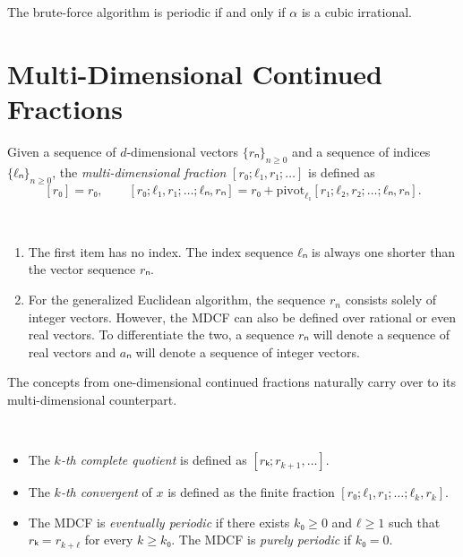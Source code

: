 \begin{conjecture}
  The brute-force algorithm is periodic if and only if $α$ is a cubic irrational.
\end{conjecture}

\section{Multi-Dimensional Continued Fractions}

\begin{definition}
  Given a sequence of $d$-dimensional vectors $\{rₙ\}_{n ≥ 0}$ and a sequence of
  indices $\{ℓₙ\}_{n ≥ 0}$, the \emph{multi-dimensional fraction} $[r₀; ℓ₁, r₁; …]$ is defined as
  \[
    [r₀] = r₀, \qquad [r₀; ℓ₁, r₁; …; ℓₙ, rₙ] = r₀ + \mathrm{pivot}_{ℓ₁}[r₁; ℓ₂, r₂; …; ℓₙ, rₙ].
  \]
\end{definition}

\begin{remark}~
  \begin{enumerate}
    \item
      The first item has no index.
      The index sequence $ℓₙ$ is always one shorter than the vector sequence $rₙ$.
    \item
      For the generalized Euclidean algorithm, the sequence $r_n$ consists solely of integer vectors.
      However, the MDCF can also be defined over rational or even real vectors.
      To differentiate the two, a sequence $rₙ$ will denote a sequence of real
      vectors and $aₙ$ will denote a sequence of integer vectors.
  \end{enumerate}
\end{remark}

The concepts from one-dimensional continued fractions naturally carry over to its
multi-dimensional counterpart.

\begin{definition}~
  \begin{itemize}
    \item The \emph{$k$-th complete quotient} is defined as $[rₖ; r_{k+1}, …]$.
    \item The \emph{$k$-th convergent} of $x$ is defined as the finite fraction $[r₀; ℓ₁, r₁; …; ℓ_k, r_k]$.
    \item The MDCF is \emph{eventually periodic} if there exists $k₀ ≥ 0$ and $ℓ ≥ 1$ such that $rₖ = r_{k+ℓ}$ for every $k ≥ k₀$.
      The MDCF is \emph{purely periodic} if $k₀ = 0$.
  \end{itemize}
\end{definition}

